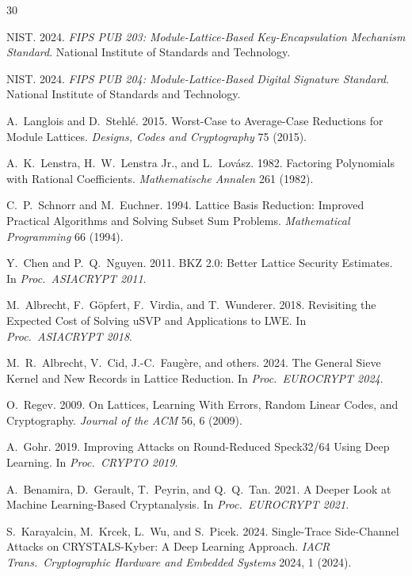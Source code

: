 \documentclass[sigconf,nonacm]{acmart}
\begin{document}
\sloppy

\begin{thebibliography}{30}

NIST. 2024. \textit{FIPS PUB 203: Module-Lattice-Based Key-Encapsulation
Mechanism Standard}. National Institute of Standards and Technology.

NIST. 2024. \textit{FIPS PUB 204: Module-Lattice-Based Digital
Signature Standard}. National Institute of Standards and Technology.

A.~Langlois and D.~Stehl\'e. 2015. Worst-Case to Average-Case Reductions
for Module Lattices. \textit{Designs, Codes and Cryptography} 75
(2015).

A.~K.~Lenstra, H.~W.~Lenstra Jr., and L.~Lov\'asz. 1982. Factoring
Polynomials with Rational Coefficients. \textit{Mathematische
Annalen} 261 (1982).

C.~P.~Schnorr and M.~Euchner. 1994. Lattice Basis Reduction:
Improved Practical Algorithms and Solving Subset Sum Problems.
\textit{Mathematical Programming} 66 (1994).

Y.~Chen and P.~Q.~Nguyen. 2011. BKZ 2.0: Better Lattice Security
Estimates. In \textit{Proc.\ ASIACRYPT 2011}.

M.~Albrecht, F.~G\"opfert, F.~Virdia, and T.~Wunderer. 2018. Revisiting
the Expected Cost of Solving uSVP and Applications to LWE. In
\textit{Proc.\ ASIACRYPT 2018}.

M.~R.~Albrecht, V.~Cid, J.-C.~Faug\`ere, and others. 2024. The General
Sieve Kernel and New Records in Lattice Reduction. In \textit{Proc.\
EUROCRYPT 2024}.

O.~Regev. 2009. On Lattices, Learning With Errors, Random Linear
Codes, and Cryptography. \textit{Journal of the ACM} 56, 6 (2009).

A.~Gohr. 2019. Improving Attacks on Round-Reduced Speck32/64 Using
Deep Learning. In \textit{Proc.\ CRYPTO 2019}.

A.~Benamira, D.~Gerault, T.~Peyrin, and Q.~Q.~Tan. 2021. A
Deeper Look at Machine Learning-Based Cryptanalysis. In
\textit{Proc.\ EUROCRYPT 2021}.

S.~Karayalcin, M.~Krcek, L.~Wu, and S.~Picek. 2024. Single-Trace
Side-Channel Attacks on CRYSTALS-Kyber: A Deep Learning Approach.
\textit{IACR Trans.\ Cryptographic Hardware and Embedded Systems}
2024, 1 (2024).


\end{thebibliography}
\end{document}
